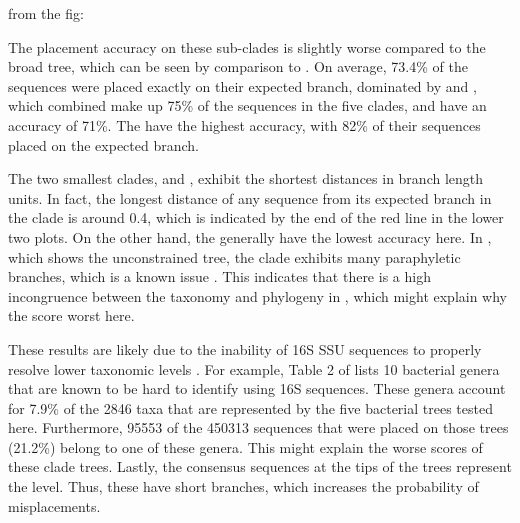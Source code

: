 %
%
%
%
%

from the fig:

The placement accuracy on these sub-clades is slightly worse compared to the broad  tree,
which can be seen by comparison to .
On average, 73.4\% of the sequences were placed exactly on their expected branch,
dominated by  and ,
which combined make up 75\% of the sequences in the five clades, and have an accuracy of 71\%.
The  have the highest accuracy,
with 82\% of their sequences placed on the expected branch.

The two smallest clades,  and ,
exhibit the shortest distances in branch length units.
In fact, the longest distance of any sequence from its expected branch in the  clade
is around \num{0.4}, which is indicated by the end of the red line in the lower two plots.
On the other hand, the  generally have the lowest accuracy here.
In , which shows the unconstrained  tree,
the  clade exhibits many paraphyletic branches,
which is a known issue \citep{Parks2018}.
This indicates that there is a high incongruence
between the  taxonomy and phylogeny in ,
which might explain why the  score worst here.

These results are likely due to the inability of 16S SSU sequences to properly resolve lower taxonomic levels
\citep{Mignard2006,Petti2007,Janda2007}.
For example, Table 2 of \citep{Janda2007} lists \num{10} bacterial genera
that are known to be hard to identify using 16S sequences.
These genera account for \num{7.9}\% of the \num{2846} taxa
that are represented by the five bacterial trees tested here.
Furthermore, \num{95 553} of the \num{450 313} sequences that were placed on those trees (\num{21.2}\%)
belong to one of these genera.
This might explain the worse scores of these clade trees.
Lastly, the consensus sequences at the tips of the trees represent the  level.
Thus, these have short branches, which increases the probability of misplacements.
%

